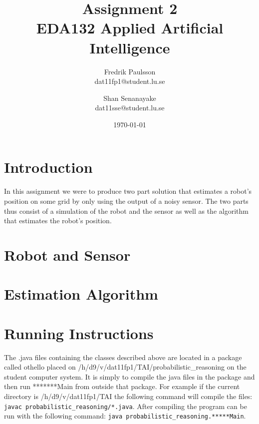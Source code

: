 \documentclass[a4paper]{article}
\title{Assignment 2 \\ EDA132 Applied Artificial Intelligence}
\date{\today}
\author{Fredrik Paulsson \\ dat11fp1@student.lu.se
\and Shan Senanayake \\ dat11sse@student.lu.se}
\begin{document}
\maketitle


\section{Introduction} In this assignment we were to produce two part solution
that estimates a robot's position on some grid by only using the output of a
noisy sensor. The two parts thus consist of a simulation of the robot and the
sensor as well as the algorithm that estimates the robot's position.

\section{Robot and Sensor}

\section{Estimation Algorithm}

\section{Running Instructions} The .java files containing the classes described
above are located in a package called othello placed on
/h/d9/v/dat11fp1/TAI/probabilistic\_reasoning on the student computer system. It
is simply to compile the java files in the package and then run *******Main from
outside that package. For example if the current directory is
/h/d9/v/dat11fp1/TAI the following command will compile the files: \texttt{javac
probabilistic\_reasoning/*.java}. After compiling the program can be run with
the following command: \texttt{java probabilistic\_reasoning.*****Main}.

\end{document}
